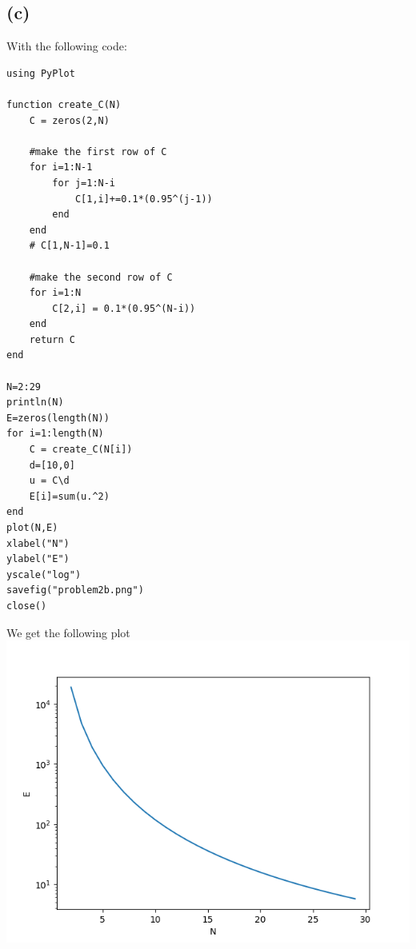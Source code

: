 \subsection*{(c)}
With the following code:
\begin{verbatim}
using PyPlot

function create_C(N)
    C = zeros(2,N)

    #make the first row of C 
    for i=1:N-1
        for j=1:N-i
            C[1,i]+=0.1*(0.95^(j-1))
        end
    end
    # C[1,N-1]=0.1 

    #make the second row of C 
    for i=1:N
        C[2,i] = 0.1*(0.95^(N-i))
    end
    return C
end

N=2:29
println(N)
E=zeros(length(N))
for i=1:length(N)
    C = create_C(N[i])
    d=[10,0]
    u = C\d
    E[i]=sum(u.^2)
end
plot(N,E)
xlabel("N")
ylabel("E")
yscale("log")
savefig("problem2b.png")
close()
\end{verbatim}
We get the following plot\\
\includegraphics*[scale=0.7]{problem2b.png}
